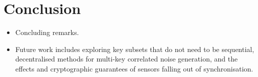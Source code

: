 \documentclass[conference]{IEEEtran}
\begin{document}
\section{Conclusion}\label{sec:conc}
\begin{itemize}
  \item Concluding remarks.
  \item Future work includes exploring key subsets that do not need to be sequential, decentralised methods for multi-key correlated noise generation, and the effects and cryptographic guarantees of sensors falling out of synchronisation.
\end{itemize}



% 
%                                            
%                                            
%                                            
% 




\end{document}
